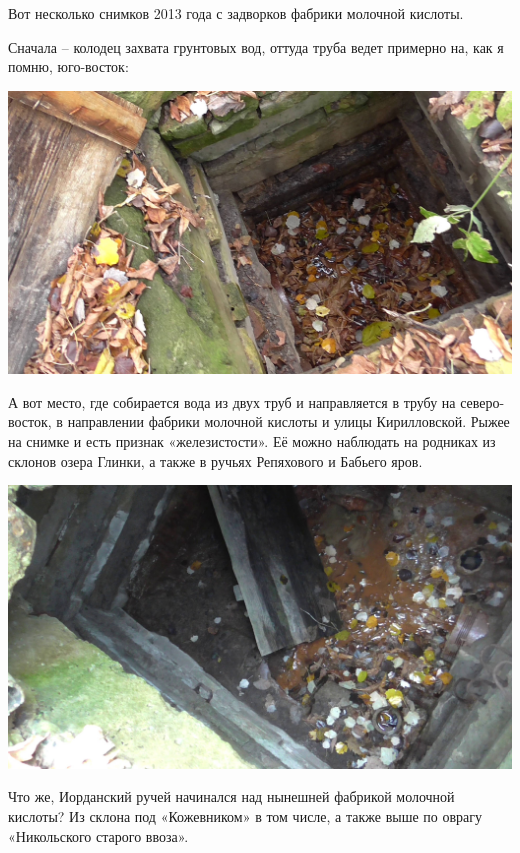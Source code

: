 Вот несколько снимков 2013 года с задворков фабрики молочной кислоты.

Сначала – колодец захвата грунтовых вод, оттуда труба ведет примерно на, как я помню, юго-восток:

\begin{center}
\includegraphics[width=\linewidth]{chast-kirvys/iordanruch/s_vlcsnap-2014-05-16-20h08m14s138.jpg}
\end{center}

А вот место, где собирается вода из двух труб и направляется в трубу на северо-восток, в направлении фабрики молочной кислоты и улицы Кирилловской. Рыжее на снимке и есть признак «железистости». Её можно наблюдать на родниках из склонов озера Глинки, а также в ручьях Репяхового и Бабьего яров.

\begin{center}
\includegraphics[width=\linewidth]{chast-kirvys/iordanruch/s_vlcsnap-2014-05-16-20h10m19s241.jpg}
\end{center}

Что же, Иорданский ручей начинался над нынешней фабрикой молочной кислоты? Из склона под «Кожевником» в том числе, а также выше по оврагу «Никольского старого ввоза».

